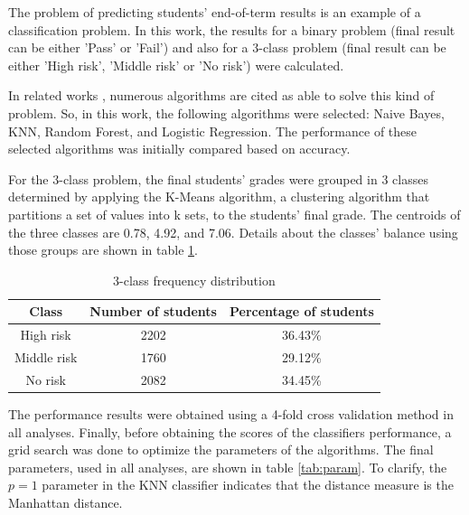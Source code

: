 The problem of predicting students' end-of-term results is an example of a classification problem. In this work, the results for a binary problem (final result can be either 'Pass' or 'Fail') and also for a 3-class problem (final result can be either 'High risk', 'Middle risk' or 'No risk') were calculated.

In related works \cite{akccapinar2019using} \cite{khalil2015learning}, numerous algorithms are cited as able to solve this kind of problem. So, in this work, the following algorithms were selected: Naive Bayes, KNN, Random Forest, and Logistic Regression. The performance of these selected algorithms was initially compared based on accuracy.

For the 3-class problem, the final students' grades were grouped in 3 classes determined by applying the K-Means algorithm, a clustering algorithm that partitions a set of values into k sets, to the students' final grade. The centroids of the three classes are 0.78, 4.92, and 7.06. Details about the classes' balance using those groups are shown in table \ref{tab:3c}.

\begin{table}[htb]
\centering
\begin{tabular}{ccc} \hline
\textbf{Class} & \textbf{Number of students} & \textbf{Percentage of students} \\ \hline
High risk                & 2202                        & 36.43\%               \\
Middle risk              & 1760                        & 29.12\%               \\
No risk                  & 2082                        & 34.45\%               \\ \hline
\end{tabular}
\caption{3-class frequency distribution}
\label{tab:3c}
\end{table}

The performance results were obtained using a 4-fold cross validation method in all analyses. Finally, before obtaining the scores of the classifiers performance, a grid search was done to optimize the parameters of the algorithms. The final parameters, used in all analyses, are shown in table \ref{tab:param}. To clarify, the $p=1$ parameter in the KNN classifier indicates that the distance measure is the Manhattan distance.

